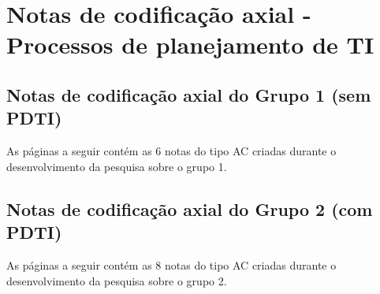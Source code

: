 \chapter{Notas de codificação axial - Processos de planejamento de TI} %
\label{apendice:j_notas_ac}
\section{Notas de codificação axial do Grupo 1 (sem PDTI)}
As páginas a seguir contém as 6 notas do tipo AC criadas durante o desenvolvimento da pesquisa sobre o grupo 1.



\section{Notas de codificação axial do Grupo 2 (com PDTI)}
As páginas a seguir contém as 8 notas do tipo AC criadas durante o desenvolvimento da pesquisa sobre o grupo 2.

